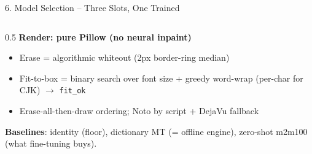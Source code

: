 \documentclass[10pt,aspectratio=169]{beamer}
\begin{document}
\begin{frame}{6. Model Selection -- Three Slots, One Trained}
\begin{columns}[T]
\begin{column}{0.5\textwidth}
\textbf{Render: pure Pillow (no neural inpaint)}
\begin{itemize}\scriptsize
  \item Erase = algorithmic whiteout (2px border-ring median)
  \item Fit-to-box = binary search over font size + greedy word-wrap (per-char for CJK) $\rightarrow$ \texttt{fit\_ok}
  \item Erase-all-then-draw ordering; Noto by script + DejaVu fallback
\end{itemize}

\textbf{Baselines}: identity (floor), dictionary MT (= offline engine), zero-shot m2m100 (what fine-tuning buys).
\end{column}
\end{columns}
\end{frame}
\end{document}
